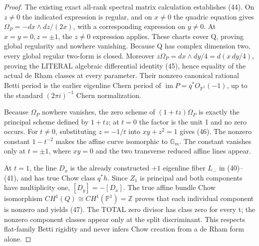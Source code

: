 \documentclass[11pt]{article}
\begin{document}
\begin{proof}
The existing exact all-rank spectral matrix
calculation establishes (44).
On $z\ne0$ the indicated expression is
regular, and on $x\ne0$ the quadric equation
gives
$\Omega_P=-dx\wedge dz/(2x)$,
with a corresponding expression on $y\ne0$.
At $x=y=0,z=\pm1$, the $z\ne0$
expression applies.
These charts cover Q, proving global
regularity and nowhere vanishing.
Because Q has complex dimension two,
every global regular two-form is closed.
Moreover
$z\Omega_P=dx\wedge dy/4
             =d(x\,dy/4)$,
proving the LITERAL algebraic differential
identity (45), hence equality of the
actual de Rham classes at every parameter.
Their nonzero canonical rational Betti
period is the earlier eigenline Chern period
of $\operatorname{im}P=q^*O_{\mathbb P^1}(-1)$,
up to the standard $(2\pi i)^{-1}$
Chern normalization.

Because $\Omega_P$ nowhere vanishes,
the zero scheme of $(1+tz)\Omega_P$
is exactly the principal scheme
defined by $1+tz$; at $t=0$ the
factor is the unit 1 and no zero occurs.
For $t\ne0$, substituting $z=-1/t$
into $xy+z^2=1$ gives (46).
The nonzero constant $1-t^{-2}$
makes the affine curve isomorphic
to $\mathbb G_m$. The constant vanishes
only at $t=\pm1$, where $xy=0$
and the two transverse reduced affine
lines appear.

At $t=1$, the line $D_x$ is the
already constructed $+1$ eigenline
fiber $L_-$ in (40)--(41), and has
true Chow class $q^*h$.
Since $Z_1$ is principal and both
components have multiplicity one,
$[D_y]=-[D_x]$. The true affine
bundle Chow isomorphism
$CH^1(Q)\cong CH^1(\mathbb P^1)=\mathbb Z$
proves that each individual component
is nonzero and yields (47).
The TOTAL zero divisor has class zero
for every t; the nonzero component
classes appear only at the split
discriminant. This respects flat-family
Betti rigidity and never infers Chow
creation from a de Rham form alone.
\end{proof}
\end{document}
